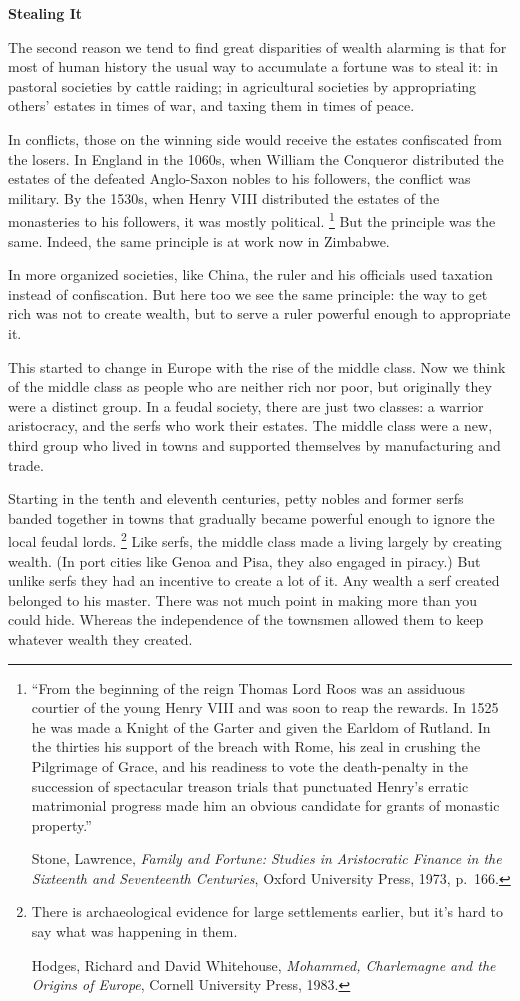 \documentclass[12pt]{book}
\begin{document}
\textbf{Stealing It}

The second reason we tend to find great disparities of wealth alarming
is that for most of human history the usual way to accumulate a fortune
was to steal it: in pastoral societies by cattle raiding; in
agricultural societies by appropriating others' estates in times of war,
and taxing them in times of peace.

In conflicts, those on the winning side would receive the estates
confiscated from the losers. In England in the 1060s, when William the
Conqueror distributed the estates of the defeated Anglo-Saxon nobles to
his followers, the conflict was military. By the 1530s, when Henry VIII
distributed the estates of the monasteries to his followers, it was
mostly political. \footnote{``From the beginning of the reign Thomas Lord Roos was an
assiduous courtier of the young Henry VIII and was soon to reap the
rewards. In 1525 he was made a Knight of the Garter and given the
Earldom of Rutland. In the thirties his support of the breach with Rome,
his zeal in crushing the Pilgrimage of Grace, and his readiness to vote
the death-penalty in the succession of spectacular treason trials that
punctuated Henry's erratic matrimonial progress made him an obvious
candidate for grants of monastic property.''

Stone, Lawrence, \emph{Family and Fortune: Studies in Aristocratic
Finance in the Sixteenth and Seventeenth Centuries}, Oxford University
Press, 1973, p.~166.} But the principle was the
same. Indeed, the same principle is at work now in Zimbabwe.

In more organized societies, like China, the ruler and his officials
used taxation instead of confiscation. But here too we see the same
principle: the way to get rich was not to create wealth, but to serve a
ruler powerful enough to appropriate it.

This started to change in Europe with the rise of the middle class. Now
we think of the middle class as people who are neither rich nor poor,
but originally they were a distinct group. In a feudal society, there
are just two classes: a warrior aristocracy, and the serfs who work
their estates. The middle class were a new, third group who lived in
towns and supported themselves by manufacturing and trade.

Starting in the tenth and eleventh centuries, petty nobles and former
serfs banded together in towns that gradually became powerful enough to
ignore the local feudal lords. \footnote{There is archaeological evidence for large settlements earlier,
but it's hard to say what was happening in them.

Hodges, Richard and David Whitehouse, \emph{Mohammed, Charlemagne and
the Origins of Europe}, Cornell University Press, 1983.} Like serfs, the
middle class made a living largely by creating wealth. (In port cities
like Genoa and Pisa, they also engaged in piracy.) But unlike serfs they
had an incentive to create a lot of it. Any wealth a serf created
belonged to his master. There was not much point in making more than you
could hide. Whereas the independence of the townsmen allowed them to
keep whatever wealth they created.
\end{document}
